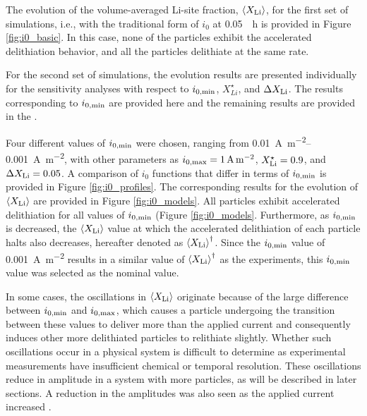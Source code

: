 \documentclass{article}
\begin{document}
The evolution of the volume-averaged Li-site fraction,
$\left<X_{\rm{Li}}\right>$, for the first set of simulations, i.e.,
with the traditional form of $i_0$ at \SI{0.05}{\per\hour} is provided
in Figure \ref{fig:i0_basic}. In this case, none of the particles
exhibit the accelerated delithiation behavior, and all the particles
delithiate at the same rate.

For the second set of simulations, the evolution results are presented
individually for the sensitivity analyses with respect to
$i_{0,\rm{min}}$, $X_{Li}^{\star}$, and $\Delta X_{\rm{Li}}$. The
results corresponding to $i_{0,\rm{min}}$ are provided here and the
remaining results are provided in the .

Four different values of $i_{0,\rm{min}}$ were chosen, ranging from
\SIrange{0.01}{0.001}{\ampere\per\meter\squared}, with other
parameters as $i_{0,\rm{max}} = \SI{1}{\ampere\per\meter\squared}$,
$X_{\rm{Li}}^{\star} = 0.9$, and $\Delta X_{\rm{Li}} = 0.05$. A
comparison of $i_0$ functions that differ in terms of $i_{0,\rm{min}}$
is provided in Figure \ref{fig:i0_profiles}. The corresponding results
for the evolution of $\left<X_{\rm{Li}}\right>$ are provided in Figure
\ref{fig:i0_models}. All particles exhibit accelerated delithiation for
all values of $i_{0,\rm{min}}$ (Figure
\ref{fig:i0_models}. Furthermore, as $i_{0,\rm{min}}$ is decreased,
the $\left<X_{\rm{Li}}\right>$ value at which the accelerated
delithiation of each particle halts also decreases, hereafter denoted
as $\left<X_{\rm{Li}}\right>^\dagger$. Since the $i_{0,\rm{min}}$
value of \SI{0.001}{\ampere\per\meter\squared} results in a similar
value of $\left<X_{\rm{Li}}\right>^\dagger$ as the experiments, this
$i_{0,\rm{min}}$ value was selected as the nominal value.

In some cases, the oscillations in $\left<X_{\rm{Li}}\right>$
originate because of the large difference between $i_{0,\rm{min}}$ and
$i_{0,\rm{max}}$, which causes a particle undergoing the transition
between these values to deliver more than the applied current and
consequently induces other more delithiated particles to relithiate
slightly. Whether such oscillations occur in a physical system is
difficult to determine as experimental measurements have insufficient
chemical or temporal resolution. These oscillations reduce in
amplitude in a system with more particles, as will be described in
later sections. A reduction in the amplitudes was also seen as the
applied current increased .
\end{document}
